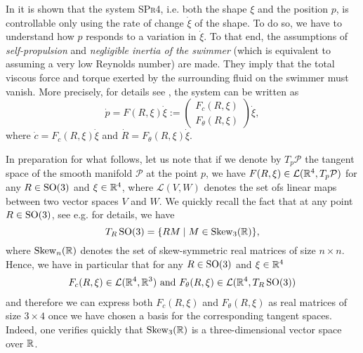 In \cite{Alouges2013} it is shown that the system \textsc{SPr4}, i.e. both the shape $\xi$ and the position $p$, is controllable only using the rate of change $\dot{\xi}$ of the shape. To do so, we have to understand how $p$ responds to a variation in $\dot{\xi}$. To that end, the assumptions of \emph{self-propulsion} and \emph{negligible inertia of the swimmer} (which is equivalent to assuming a very low Reynolds number) are made. They imply that the total viscous force and torque exerted by the surrounding fluid on the swimmer must vanish. More precisely, for details see \cite{Alouges2013}, the system can be written as
\begin{equation}
\label{eq: control system}
	\dot{p} = F(R, \xi) \dot{\xi} := \left ( \begin{array}{c}
	F_c(R, \xi) \\
	F_\theta(R, \xi)
	\end{array}  \right ) \dot{\xi},
\end{equation}
where $\dot{c} = F_c(R, \xi) \dot{\xi}$ and $\dot{R} = F_\theta (R, \xi) \dot{\xi} $. 

In preparation for what follows, let us note that if we denote by $T_p \mathcal{P}$ the tangent space of the smooth manifold $\mathcal{P}$ at the point $p$, we have $F(R, \xi) \in \mathcal{L}(\mathbb{R}^4, T_{p}\mathcal{P})$ for any $R \in \operatorname{SO}(3)$ and $\xi \in \mathbb{R}^4$, where $\mathcal{L}(V, W)$ denotes the set ofs linear maps between two vector spaces $V$ and $W$. We quickly recall the fact that at any point $R \in \operatorname{SO}(3)$, see e.g. \cite{Hall2015} for details, we have 
\begin{equation}
	T_R \operatorname{SO}(3)  = \{R M \mid M \in \operatorname{Skew}_3(\mathbb{R})\},
\end{equation}
where $\operatorname{Skew}_n(\mathbb{R})$ denotes the set of skew-symmetric real matrices of size $n \times n$. Hence, we have in particular that for any $R \in \operatorname{SO}(3)$ and $\xi \in \mathbb{R}^4$
\begin{equation}
\begin{aligned}
	F_c(R, \xi) \in \mathcal{L}(\mathbb{R}^4, \mathbb{R}^3) \text{ and } F_{\theta}(R, \xi) \in \mathcal{L}(\mathbb{R}^4,T_R \operatorname{SO}(3))
\end{aligned}
\end{equation}
and therefore we can express both $F_c(R, \xi)$ and $F_{\theta}(R, \xi)$ as real matrices of size $3 \times 4$ once we have chosen a basis for the corresponding tangent spaces. Indeed, one verifies quickly that $\operatorname{Skew}_3(\mathbb{R})$ is a three-dimensional vector space over $\mathbb{R}$.


